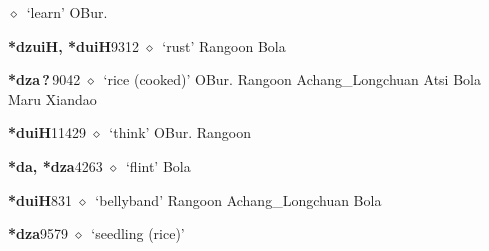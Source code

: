 \begin{list}{}{\leftmargin=1.5em \itemindent=-1.5em}
         $\diamond$~`learn'
         OBur. 
  \item {\footnotesize \textbf{*dzuiH, *duiH}}{\tiny 9312}
\hspace{1ex}
         $\diamond$~`rust'
         Rangoon 
\hspace{1ex}
         Bola 
  \item {\footnotesize \textbf{*dza\,?\,}}{\tiny 9042}
\hspace{1ex}
         $\diamond$~`rice (cooked)'
         OBur. 
\hspace{1ex}
         Rangoon 
\hspace{1ex}
         Achang\_Longchuan 
\hspace{1ex}
         Atsi 
\hspace{1ex}
         Bola 
\hspace{1ex}
         Maru 
\hspace{1ex}
         Xiandao 
  \item {\footnotesize \textbf{*duiH}}{\tiny 11429}
\hspace{1ex}
         $\diamond$~`think'
         OBur. 
\hspace{1ex}
         Rangoon 
  \item {\footnotesize \textbf{*da, *dza}}{\tiny 4263}
\hspace{1ex}
         $\diamond$~`flint'
         Bola 
  \item {\footnotesize \textbf{*duiH}}{\tiny 831}
\hspace{1ex}
         $\diamond$~`bellyband'
         Rangoon 
\hspace{1ex}
         Achang\_Longchuan 
\hspace{1ex}
         Bola 
  \item {\footnotesize \textbf{*dza}}{\tiny 9579}
\hspace{1ex}
         $\diamond$~`seedling (rice)'

\end{list}
